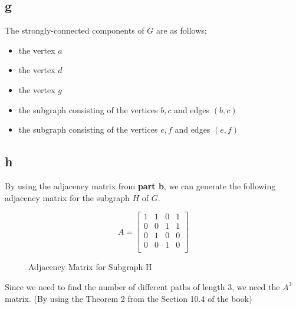 \documentclass[11pt]{article}
\begin{document}
\subsection*{g}
The strongly-connected components of $G$ are as follows;
\begin{itemize}
    \item the vertex $a$
    \item the vertex $d$
    \item the vertex $g$
    \item the subgraph consisting of the vertices $b,c$ and edges $(b,c)$
    \item the subgraph consisting of the vertices $e,f$ and edges $(e,f)$
\end{itemize}
\subsection*{h}
By using the adjacency matrix from \textbf{part b}, we can generate the following adjacency matrix for the subgraph $H$ of $G$. 

\begin{figure}[H]
$$ A=  \begin{bmatrix}
        1 & 1 & 0 & 1 \\
        0 & 0 & 1 & 1 \\
        0 & 1 & 0 & 0 \\
        0 & 0 & 1 & 0 \\
    \end{bmatrix} $$
    \caption{Adjacency Matrix for Subgraph H}
\end{figure}

Since we need to find the number of different paths of length $3$, we need the $A^3$ matrix. (By using the Theorem 2 from the Section 10.4 of the book)
\end{document}

